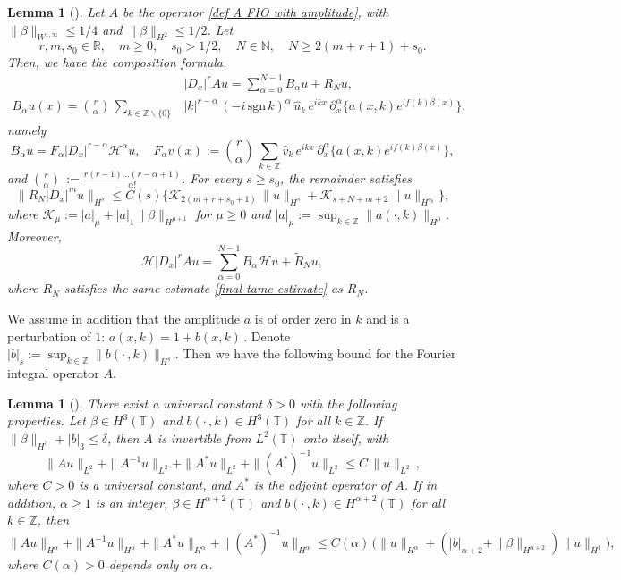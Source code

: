 \documentclass[12pt]{amsart}
\newtheorem{lemma}[theorem]{Lemma}
\theoremstyle{remark}
\theoremstyle{definition}
\numberwithin{equation}{section}
\newcommand{\p}{\partial}
\newcommand{\R}{\mathbb{R}}
\newcommand{\N}{\mathbb{N}}
\newcommand{\Z}{\mathbb{Z}}
\newcommand{\T}{{\mathbb T}}
\newcommand{\mH}{\mathcal{H}}
\newcommand{\mK}{\mathcal{K}}
\renewcommand{\a}{\alpha}
\renewcommand{\b}{\beta}
\newcommand{\inv}{^{-1}}
\begin{document}
\begin{lemma}[\hspace{1sp}\cite{MR3356988}] \label{t:Composition} 
Let $A$ be the operator \eqref{def A FIO with amplitude}, 
with $\|\b\|_{W^{1,\infty}} \leq 1/4$ and $\| \b \|_{H^2} \leq 1/2$. 
Let 
\[
r,m,s_0 \in \R, \quad 
m \geq 0, \quad
s_0 > 1/2, \quad 
N \in \N, \quad 
N \geq 2(m + r + 1) + s_0. 
\] 
Then, we have the composition formula.
\begin{align*}
&|D_x|^r A u = \sum_{\a=0}^{N-1} B_\a u + R_N u, \\   
B_\a u(x) 
= \binom{r}{\a} \,  \sum_{k \in \Z\backslash \{ 0\}} &|k|^{r-\a} \, (- i \, \text{sgn} \, k)^\a \, \hat u_k \,  e^{ikx} \, \p_x^\a \big\{ a(x,k) e^{i f(k) \b(x)} \big\},
\end{align*}
namely 
\[
B_\a u = F_\a |D_x|^{r-\a} \mH^\a u,
\quad 
F_\a v(x) := 
\binom{r}{\a} \, 
\sum_{k \in \Z} \hat v_k \, e^{ikx} \, \p_x^\a \big\{ a(x,k) e^{i f(k) \b(x)} \big\},
\]
and 
$\binom{r}{\a} \, := \frac{r (r-1) \ldots (r-\a+1)}{\a!}$. 
For every $s \geq s_0$, the remainder satisfies
\begin{equation} \label{final tame estimate}
\| R_N |D_x|^m u \|_{H^s} 
\leq 
C(s) \Big\{ \mK_{2(m+r+s_0+1)} \, \| u \|_{H^s}
+ \mK_{s + N + m + 2} \, \| u \|_{H^{s_0}} \Big\},
\end{equation}
where $\mK_\mu := | a |_{\mu} + | a |_{1}  \| \b \|_{H^{\mu + 1}}$ for $\mu \geq 0$ 
and $| a |_\mu := \sup_{k \in \Z} \| a(\cdot,k) \|_{H^\mu}$. 
Moreover,
\[
\mH |D_x|^r A u = \sum_{\a=0}^{N-1} B_\a \mH u + \tilde R_N u,
\]
where $\tilde R_N$ satisfies the same estimate \eqref{final tame estimate} as $R_N$.
\end{lemma}

We assume in addition that the amplitude $a$ is of order zero in $k$ and is a perturbation of $1$: $a(x,k) = 1 + b(x,k)\,$.
Denote $|b|_s := \sup_{k \in \Z} \| b(\cdot\,,k) \|_{H^s}$.
Then we have the following bound for the Fourier integral operator $A$.
\begin{lemma}[\hspace{1sp}\cite{MR3356988}] \label{t:Einv} 
There exist a universal constant $\delta > 0$ with the following properties. 
Let $\b \in H^3(\T)$ and $b(\cdot\,,k) \in H^3(\T)$ for all $k \in \Z$. 
If $\| \b \|_{H^3} + |b|_3 \leq \delta$, then $A$ is invertible from $L^2(\T)$ onto itself, with 
\[
\| A u \|_{L^2} + \| A\inv u \|_{L^2} + \|A^* u\|_{L^2} +  \|(A^*)^{-1} u\|_{L^2} \leq C \, \| u \|_{L^2} \,,
\]
where $C>0$ is a universal constant, and $A^*$ is the adjoint operator of $A$. 
If in addition, $\a \geq 1$ is an integer, $\b \in H^{\a+2}(\T)$ and $b(\cdot\,,k) \in H^{\a+2}(\T)$ for all $k \in \Z$, then 
\begin{equation*}
\| A u \|_{H^\a} + \| A\inv u \|_{H^\a} + \| A^* u \|_{H^\a} + \| (A^*)\inv u \|_{H^\a}
\leq C(\a) \, \Big( \| u \|_{H^\a} + (|b|_{\a+2} + \| \b\|_{H^{\a+2}}) \| u \|_{H^1} \Big), 
\end{equation*}
where $C(\a)>0$ depends only on $\a$.
\end{lemma}
\end{document}

